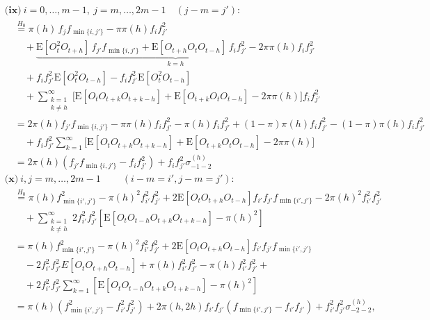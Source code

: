 ﻿\documentclass[12pt,a4paper]{scrreprt}
\theoremstyle{definition}
\begin{document}
{\small\allowdisplaybreaks
\begin{align*}
&\textbf{(ix)}\ i = 0,\ldots,m-1,\ j = m,\ldots,2m-1 \quad(j-m = j'):\\
&\quad \overset{H_0}{=} 
\pi(h)\,f_{j}f_{\min\{i,j'\}} - \pi\pi(h)f_i f_{j'}^2 \\
&\qquad + \underbrace{\mathrm{E}[O_t^2 O_{t+h}]\,f_{j'}f_{\min\{i,j'\}} 
+ \mathrm{E}[O_{t+h} O_t O_{t-h}]\,f_i f_{j'}^2 - 2 \pi \pi(h)f_i f_{j'}^2}_{k=h} \\
&\qquad + f_i f_{j'}^2 \mathrm{E}[O_t^2 O_{t-h}] - f_i f_{j'}^2\mathrm{E}[O_t^2 O_{t-h}] \\
&\qquad + \sum_{\substack{k=1\\k\neq h}}^{\infty} \bigl[
\mathrm{E}[O_t O_{t+k} O_{t+k-h}] + \mathrm{E}[O_{t+k} O_t O_{t-h}]
- 2\pi\pi(h)\bigr] f_i f_{j'}^2 \\
&\quad =2\pi(h)f_{j'}f_{\min\{i,j'\}} - \pi \pi(h)f_i f_{j'}^2 - \pi(h)f_i f_{j'}^2
+ (1-\pi)\pi(h)f_i f_{j'}^2 - (1-\pi)\pi(h)f_i f_{j'}^2\\ 
&\qquad + f_{i}f_{j'}^2 \sum_{k=1}^{\infty} \bigl[
\mathrm{E}[O_t O_{t+k} O_{t+k-h}] + \mathrm{E}[O_{t+k} O_t O_{t-h}]
- 2\pi\pi(h)\bigr] \\
&\quad = 2\pi(h)(f_{j'}f_{\min\{i,j'\}} - f_i f_{j'}^2) + f_i f_{j'}^2 \sigma^{(h)}_{-1-2}\\[2ex]
&\textbf{(x)}\ i,j = m,\ldots,2m-1\ \quad \quad(i-m = i', j-m = j'):\\
&\quad \overset{H_0}{=} \pi(h)f_{\min\{i',j'\}}^2 - \pi(h)^2 f_{i'}^2f_{j'}^2 
+ 2 \mathrm{E}[O_t O_{t+h} O_{t-h}] f_{i'} f_{j'} f_{\min\{i',j'\}} - 2 \pi(h)^2 f_{i'}^2 f_{j'}^2 \\
&\qquad + \sum_{\substack{k=1\\k\neq h}}^{\infty} 2 f_{i'}^2 f_{j'}^2 \left[  \mathrm{E}[O_t O_{t-h} O_{t+k}O_{t+k-h}] - \pi(h)^2\right] \\
&\quad = \pi(h)f_{\min\{i', j'\}}^2 - \pi(h)^2 f_{i'}^2f_{j'}^2 
+ 2 \mathrm{E}[O_t O_{t+h} O_{t-h}] f_{i'} f_{j'} f_{\min\{i',j'\}}\\
&\qquad - 2f_{i'}^2f_{j'}^2 E[O_{t}O_{t+h}O_{t-h}] 
+ \pi(h)f_{i'}^2f_{j'}^2 - \pi(h)f_{i'}^2f_{j'}^2 + \\
&\qquad +2 f_{i'}^2f_{j'}^2 \sum_{k=1}^{\infty}  \left[  \mathrm{E}[O_t O_{t-h} O_{t+k} O_{t+k-h}] - \pi(h)^2\right] \\
&\quad = \pi(h) (f_{\min\{i',j'\}}^2- f_{i'}^2f_{j'}^2) + 2\pi(h, 2h)f_{i'}f_{j'}(f_{\min\{i',j'\}}- f_{i'}f_{j'})
+ f_{i'}^2f_{j'}^2\sigma^{(h)}_{-2-2},
\end{align*}}\noindent
\end{document}
